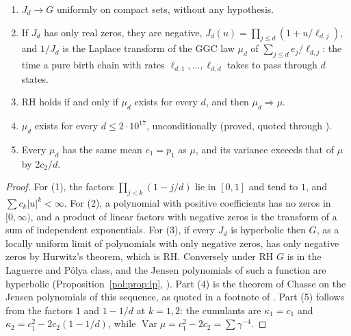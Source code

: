 \begin{proposition}\label{ht:prop:jensen}
\begin{enumerate}
\item $J_d\to G$ uniformly on compact sets, without any hypothesis.
\item If $J_d$ has only real zeros, they are negative, $J_d(u)=\prod_{j\le d}(1+u/\ell_{d,j})$, and $1/J_d$ is the Laplace transform of the GGC law $\mu_d$ of $\sum_{j\le d}e_j/\ell_{d,j}$: the time a pure birth chain with rates $\ell_{d,1},\dots,\ell_{d,d}$ takes to pass through $d$ states.
\item RH holds if and only if $\mu_d$ exists for every $d$, and then $\mu_d\Rightarrow\mu$.
\item $\mu_d$ exists for every $d\le2\cdot10^{17}$, unconditionally (proved, quoted through \cite{GORZ19}).
\item Every $\mu_d$ has the same mean $c_1=p_1$ as $\mu$, and its variance exceeds that of $\mu$ by $2c_2/d$.
\end{enumerate}
\end{proposition}

\begin{proof}
For (1), the factors $\prod_{j<k}(1-j/d)$ lie in $[0,1]$ and tend to $1$, and $\sum c_k|u|^k<\infty$. For (2), a polynomial with positive coefficients has no zeros in $[0,\infty)$, and a product of linear factors with negative zeros is the transform of a sum of independent exponentials. For (3), if every $J_d$ is hyperbolic then $G$, as a locally uniform limit of polynomials with only negative zeros, has only negative zeros by Hurwitz's theorem, which is RH. Conversely under RH $G$ is in the Laguerre and P\'olya class, and the Jensen polynomials of such a function are hyperbolic (Proposition~\ref{pol:prop:lp}, \cite{GORZ19}). Part (4) is the theorem of Chasse on the Jensen polynomials of this sequence, as quoted in a footnote of \cite{GORZ19}.
Part (5) follows from the factors $1$ and $1-1/d$ at $k=1,2$: the cumulants are $\kappa_1=c_1$ and $\kappa_2=c_1^2-2c_2(1-1/d)$, while $\operatorname{Var}\mu=c_1^2-2c_2=\sum\gamma^{-4}$.
\end{proof}

